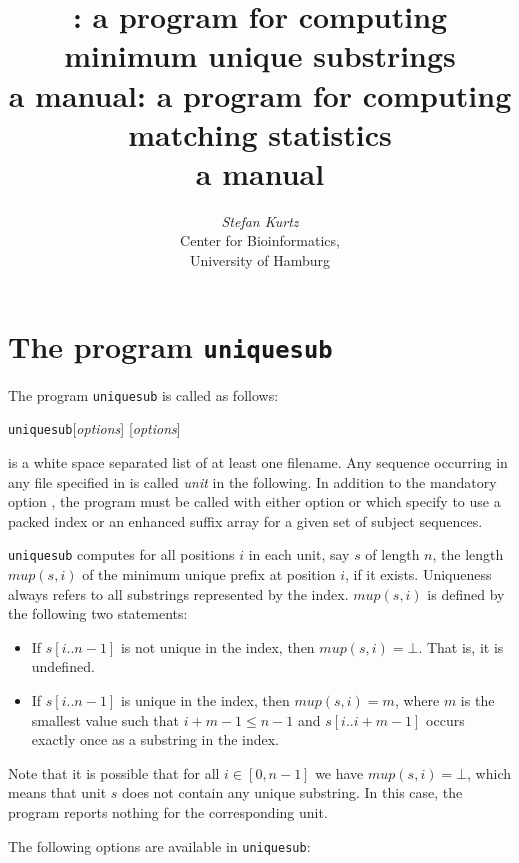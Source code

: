 \documentclass[12pt]{article}
\title{\Uniquesub: a program for computing\\
       minimum unique substrings\\
       a manual}
\title{\Matstat: a program for computing\\
       matching statistics\\
       a manual}
\author{\begin{tabular}{c}
         \textit{Stefan Kurtz}\\
         Center for Bioinformatics,\\
         University of Hamburg
        \end{tabular}}
\newcommand{\Uniquesub}[0]{\texttt{uniquesub}\xspace}
\newcommand{\Mup}[1]{\mathit{mup(s,#1)}}
\newcommand{\Substring}[3]{#1[#2..#3]}
\begin{document}
\maketitle

\section{The program \Uniquesub}

The program \Uniquesub is called as follows:
\par
\noindent\Uniquesub [\textit{options}]   [\textit{options}] 
\par
{} is a white space separated list of at least one 
filename. Any sequence occurring in any file specified in 
is called \textit{unit} in the following.
In addition to the mandatory option , the program
must be called with either option  or 
which specify to use a packed index or an enhanced suffix array for 
a given set of subject sequences.

\Uniquesub computes for all positions \(i\) in each unit, say \(s\) of length
\(n\), the length \(\Mup{i}\) of the minimum unique prefix 
at position \(i\), if it exists. Uniqueness always refers to all substrings
represented by the index. \(\Mup{i}\) is defined by the following two 
statements:
\begin{itemize}
\item
If \(\Substring{s}{i}{n-1}\) is not unique in the index, then \(\Mup{i}=\bot\).
That is, it is undefined.
\item
If \(\Substring{s}{i}{n-1}\) is unique in the index, then \(\Mup{i}=m\), where 
\(m\) is the smallest value such that \(i+m-1\leq n-1\) and 
\(\Substring{s}{i}{i+m-1}\) occurs exactly once as a substring in the index.
\end{itemize}
Note that it is possible that for all \(i\in[0,n-1]\) we have 
\(\Mup{i}=\bot\), which means that unit \(s\) does not contain any unique 
substring. In this case, the program reports nothing for the corresponding
unit.

The following options are available in \Uniquesub:
\end{document}
